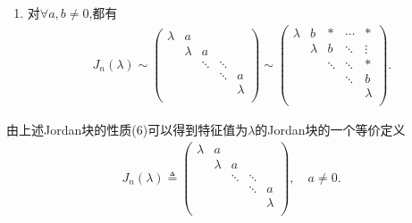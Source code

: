 \documentclass[../../main.tex]{subfiles}%
\begin{document}
\begin{proposition}[Jordan块的性质]
\begin{enumerate}[(1)]
\item 对$\forall a,b\ne 0$,都有
\begin{align*}
J_n(\lambda )\sim \left( \begin{matrix}
\lambda&		a&		&		&		\\
&		\lambda&		a&		&		\\
&		&		\ddots&		\ddots&		\\
&		&		&		\ddots&		a\\
&		&		&		&		\lambda\\
\end{matrix} \right) \sim \left( \begin{matrix}
\lambda&		b&		*&		\cdots&		*\\
&		\lambda&		b&		\ddots&		\vdots\\
&		&		\ddots&		\ddots&		*\\
&		&		&		\ddots&		b\\
&		&		&		&		\lambda\\
\end{matrix} \right) .
\end{align*}

\end{enumerate}
\end{proposition}
\begin{note}
由上述Jordan块的性质(6)可以得到特征值为$\lambda$的Jordan块的一个等价定义
\begin{align*}
J_n\left( \lambda \right) \triangleq \left( \begin{matrix}
\lambda&		a&		&		&		\\
&		\lambda&		a&		&		\\
&		&		\ddots&		\ddots&		\\
&		&		&		\ddots&		a\\
&		&		&		&		\lambda\\
\end{matrix} \right) ,\quad a\ne 0.
\end{align*}
\end{note}
\end{document}
